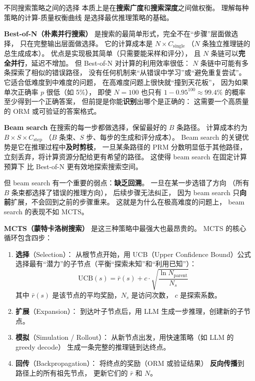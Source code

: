 不同搜索策略之间的选择
本质上是在\textbf{搜索广度}和\textbf{搜索深度}之间做权衡。
理解每种策略的计算-质量权衡曲线
是选择最优推理策略的基础。

\textbf{Best-of-N（朴素并行搜索）}
是搜索的最简单形式，完全不在“步骤”层面做选择，
只在完整输出层面做选择。
它的计算成本是 $N \times C_{\text{single}}$
（$N$ 条独立推理链的总生成成本）。
优点是实现极其简单（只需要能采样和评分），
且 $N$ 条链可以\textbf{完全并行}，延迟不增加。
但 Best-of-N 对计算的利用效率很低：
$N$ 条链中可能有多条探索了相似的错误路径，
没有任何机制来“从错误中学习”或“避免重复尝试”。
它适合低难度到中难度的问题，
在高难度问题上很快就“撞到天花板”，
因为如果单次正确率 $p$ 很低（如 5\%），
即使 $N = 100$ 也只有 $1 - 0.95^{100} \approx 99.4\%$ 的概率
至少得到一个正确答案，
但前提是你能\textbf{识别}出哪个是正确的：
这需要一个高质量的 ORM 或可验证的答案格式。

\textbf{Beam search}
在搜索的每一步都做选择，保留最好的 $B$ 条路径。
计算成本约为 $B \times S \times C_{\text{step}}$
（$B$ 条束、$S$ 步、每步的生成和评分成本）。
Beam search 的关键优势是它在推理过程中\textbf{及时剪枝}，
一旦某条路径的 PRM 分数明显低于其他路径，
立刻丢弃，将计算资源分配给更有希望的路径。
这使得 beam search 在固定计算预算下
比 Best-of-N 更有效地探索搜索空间。

但 beam search 有一个重要的弱点：\textbf{缺乏回溯}。
一旦在某一步选错了方向
（所有 $B$ 条束都选择了错误的推理方向），
后续步骤无法纠正，
因为 beam search 只\textbf{向前}扩展，不会回到之前的步骤重来。
这就是为什么在极高难度的问题上，
beam search 的表现不如 MCTS。

\textbf{MCTS（蒙特卡洛树搜索）}
是这三种策略中最强大也最昂贵的。
MCTS 的核心循环包含四步：
\begin{enumerate}[noitemsep]
  \item \textbf{选择}（Selection）：
        从根节点开始，用 UCB（Upper Confidence Bound）公式
        选择最有“潜力”的子节点（平衡“探索未知”和“利用已知”）：
        \begin{equation}
          \text{UCB}(s) = \bar{r}(s) + c \cdot \sqrt{\frac{\ln N_{\text{parent}}}{N_s}}
        \end{equation}
        其中 $\bar{r}(s)$ 是该节点的平均奖励，$N_s$ 是访问次数，
        $c$ 是探索系数。
  \item \textbf{扩展}（Expansion）：
        到达叶子节点后，用 LLM 生成一步推理，创建新的子节点。
  \item \textbf{模拟}（Simulation / Rollout）：
        从新节点出发，用快速策略（如 LLM 的 greedy decode）
        生成一条完整的推理链到达终点。
  \item \textbf{回传}（Backpropagation）：
        将终点的奖励（ORM 或验证结果）
        \textbf{反向传播}到路径上的所有祖先节点，
        更新它们的 $\bar{r}$ 和 $N$。
\end{enumerate}

